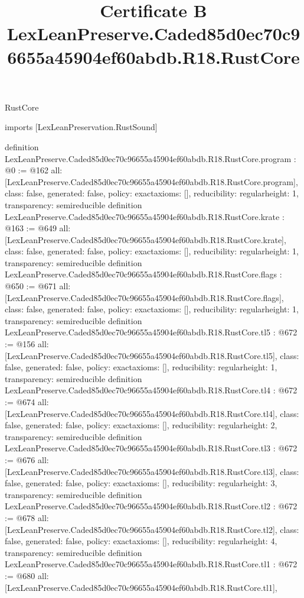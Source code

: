 \begin{lexlean}{RustCore}
\title{Certificate B LexLeanPreserve.Caded85d0ec70c96655a45904ef60abdb.R18.RustCore}
\begin{coremodule}
imports [LexLeanPreservation.RustSound]

definition LexLeanPreserve.Caded85d0ec70c96655a45904ef60abdb.R18.RustCore.program : @0 := @162 {
  all: [LexLeanPreserve.Caded85d0ec70c96655a45904ef60abdb.R18.RustCore.program],
  class: false,
  generated: false,
  policy: exact{axioms: []},
  reducibility: regular{height: 1},
  transparency: semireducible
}
definition LexLeanPreserve.Caded85d0ec70c96655a45904ef60abdb.R18.RustCore.krate : @163 := @649 {
  all: [LexLeanPreserve.Caded85d0ec70c96655a45904ef60abdb.R18.RustCore.krate],
  class: false,
  generated: false,
  policy: exact{axioms: []},
  reducibility: regular{height: 1},
  transparency: semireducible
}
definition LexLeanPreserve.Caded85d0ec70c96655a45904ef60abdb.R18.RustCore.flags : @650 := @671 {
  all: [LexLeanPreserve.Caded85d0ec70c96655a45904ef60abdb.R18.RustCore.flags],
  class: false,
  generated: false,
  policy: exact{axioms: []},
  reducibility: regular{height: 1},
  transparency: semireducible
}
definition LexLeanPreserve.Caded85d0ec70c96655a45904ef60abdb.R18.RustCore.tl5 : @672 := @156 {
  all: [LexLeanPreserve.Caded85d0ec70c96655a45904ef60abdb.R18.RustCore.tl5],
  class: false,
  generated: false,
  policy: exact{axioms: []},
  reducibility: regular{height: 1},
  transparency: semireducible
}
definition LexLeanPreserve.Caded85d0ec70c96655a45904ef60abdb.R18.RustCore.tl4 : @672 := @674 {
  all: [LexLeanPreserve.Caded85d0ec70c96655a45904ef60abdb.R18.RustCore.tl4],
  class: false,
  generated: false,
  policy: exact{axioms: []},
  reducibility: regular{height: 2},
  transparency: semireducible
}
definition LexLeanPreserve.Caded85d0ec70c96655a45904ef60abdb.R18.RustCore.tl3 : @672 := @676 {
  all: [LexLeanPreserve.Caded85d0ec70c96655a45904ef60abdb.R18.RustCore.tl3],
  class: false,
  generated: false,
  policy: exact{axioms: []},
  reducibility: regular{height: 3},
  transparency: semireducible
}
definition LexLeanPreserve.Caded85d0ec70c96655a45904ef60abdb.R18.RustCore.tl2 : @672 := @678 {
  all: [LexLeanPreserve.Caded85d0ec70c96655a45904ef60abdb.R18.RustCore.tl2],
  class: false,
  generated: false,
  policy: exact{axioms: []},
  reducibility: regular{height: 4},
  transparency: semireducible
}
definition LexLeanPreserve.Caded85d0ec70c96655a45904ef60abdb.R18.RustCore.tl1 : @672 := @680 {
  all: [LexLeanPreserve.Caded85d0ec70c96655a45904ef60abdb.R18.RustCore.tl1],
}
\end{coremodule}
\end{lexlean}
